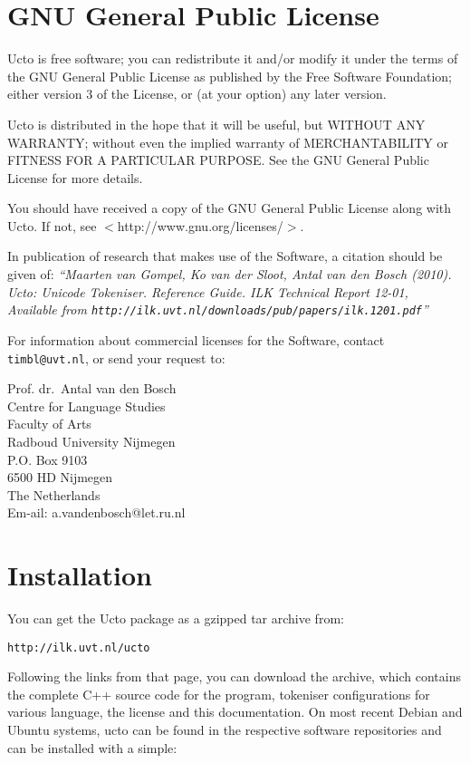 \documentclass{report}
\begin{document}
\chapter{GNU General Public License}
\label{license}

Ucto is free software; you can redistribute it and/or modify it under the terms of the GNU General Public License as published by the Free
Software Foundation; either version 3 of the License, or (at your option) any later version.

Ucto is distributed in the hope that it will be useful, but WITHOUT ANY WARRANTY; without even the implied warranty of MERCHANTABILITY or FITNESS FOR A PARTICULAR PURPOSE.  See the GNU General Public License for more details.

You should have received a copy of the GNU General Public License along with Ucto.  If not, see $<$http://www.gnu.org/licenses/$>$.

In publication of research that makes use of the Software, a citation should be given of: {\em ``Maarten van Gompel, Ko van der Sloot, Antal van den Bosch (2010). Ucto: Unicode Tokeniser. Reference Guide. ILK Technical Report 12-01, \\ Available from {\tt http://ilk.uvt.nl/downloads/pub/papers/ilk.1201.pdf}''}

For information about commercial licenses for the Software, contact {\tt timbl@uvt.nl}, or send your request to:

Prof. dr.~Antal van den Bosch\\
Centre for Language Studies\\
Faculty of Arts \\
Radboud University Nijmegen \\
P.O. Box 9103 \\
6500 HD Nijmegen \\ 
The Netherlands \\
Em-ail: a.vandenbosch@let.ru.nl 

\pagestyle{headings}

\chapter{Installation}
\vspace{-1cm}


You can get the Ucto package as a gzipped tar archive from:

{\tt http://ilk.uvt.nl/ucto}

Following the links from that page, you can download the archive, which contains the complete C++ source code for the program, tokeniser configurations for various language, the license and this documentation. On most recent Debian and Ubuntu systems, ucto can be found in the respective software repositories and can be installed with a simple:
\end{document}
